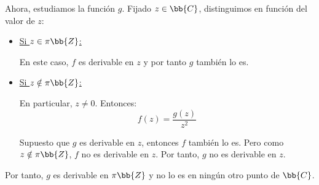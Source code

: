 \documentclass[12pt]{article}
\begin{document}
\begin{ejercicio}[3.5 puntos]
        Ahora, estudiamos la función $g$. Fijado $z\in \bb{C}$, distinguimos en función del valor de $z$:
        \begin{itemize}
            \item \ul{Si $z\in \pi\bb{Z}$:} 
            
            En este caso, $f$ es derivable en $z$ y por tanto $g$ también lo es.
            
            \item \ul{Si $z\notin \pi\bb{Z}$:}
            
            En particular, $z\neq 0$. Entonces:
            \begin{equation*}
                f(z) = \dfrac{g(z)}{z^2}
            \end{equation*}

            Supuesto que $g$ es derivable en $z$, entonces $f$ también lo es. Pero como $z\notin \pi\bb{Z}$, $f$ no es derivable en $z$. Por tanto, $g$ no es derivable en $z$.
        \end{itemize}

        Por tanto, $g$ es derivable en $\pi\bb{Z}$ y no lo es en ningún otro punto de $\bb{C}$.
    \end{ejercicio}
\end{document}
